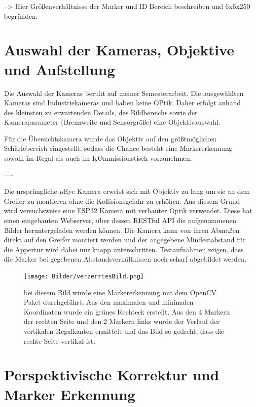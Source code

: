     --> Hier Größenverhältnisse der Marker und ID Bereich beschreiben und 6x6x250 begründen.

    \section {Auswahl der Kameras, Objektive und Aufstellung}

    Die Auswahl der Kameras beruht auf meiner Semesterarbeit. Die ausgewählten Kameras sind Industriekameras und haben keine OPtik. 
    Daher erfolgt anhand des kleinsten zu erwartenden Details, des Bildbereichs sowie der Kameraparameter (Brennweite und Sensorgröße) eine Objektivauswahl. 

    Für die Übersichtskamera wurde das Objektiv auf den größtmöglichen Schärfebereich eingestellt, sodass die Chance besteht eine Markererkennung sowohl im Regal als auch im KOmmissionstisch vorzunehmen. 

    ----

    Die ursprüngliche $\mu$Eye Kamera erweist sich mit Objektiv zu lang um sie an dem Greifer zu montieren ohne die Kollisionsgefahr zu erhöhen. 
    Aus diesem Grund wird versuchsweise eine ESP32 Kamera mit verbauter Optik verwendet. Diese hat einen eingebauten Webserver, über dessen RESTful API die aufgenommenen Bilder heruntergeladen werden können. 
    Die Kamera kann von ihren Abmaßen direkt auf den Greifer montiert werden und der angegebene Mindestabstand für die Appertur wird dabei nur knapp unterschritten. 
    Testaufnahmen zeigen, dass die Marker bei gegebenen Abstandsverhältnissen noch scharf abgebildet werden. 

    \begin{figure}
        \caption[Optische Verzerrung]
        {\small bei diesem Bild wurde eine Markererkennung mit dem OpenCV Paket durchgeführt, Aus den maximalen und minimalen Koordinaten wurde ein grünes Rechteck erstellt. Aus den 4 Markern der rechten Seite und den 2 Markern links wurde der Verlauf der vertikalen Regalkanten ermittelt und das Bild so gedreht, dass die rechte Seite vertikal ist.}\label{fig:figure10}
        \texttt{[image: Bilder/verzerrtesBild.png]}
        \centering
    \end{figure}

    \section {Perspektivische Korrektur und Marker Erkennung}

